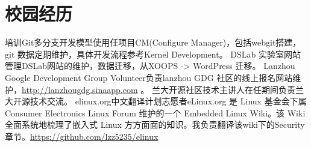 \documentclass[11pt,a4paper]{moderncv}
\begin{document}
\section{校园经历} %
{培训Git多分支开发模型使用}{}{}{}{任项目CM(Configure Manager)，包括webgit搭建，git 数据定期维护，具体开发流程参考Kernel Development。}
{DSLab 实验室网站管理}{}{}{}{DSLab网站的维护，数据迁移，从XOOPS -> WordPress 迁移。}
{Lanzhou Google Development Group Volunteer}{}{}{}{负责lanzhou GDG 社区的线上报名网站维护，\url{http://lanzhougdg.sinaapp.com} 。}
{兰大开源社区技术主讲人}{}{}{}{在任期间负责兰大开源技术交流。}
{elinux.org中文翻译计划志愿者}{}{}{}{eLinux.org 是 Linux 基金会下属 Consumer Electronics 
Linux Forum 维护的一个 Embedded Linux Wiki。该 Wiki 全面系统地梳理了嵌入式 Linux 方方面面的知识。我负责翻译该wiki下的Security章节。\url{https://github.com/lzz5235/elinux}}

\closesection{}                   %
\renewcommand{\listitemsymbol}{-} %

\nocite{*}


\end{document}
